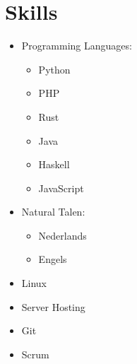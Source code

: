 \documentclass[a4paper,12pt]{article}
\begin{document}
\section{Skills}
\begin{itemize}
    \item Programming Languages:
        \begin{itemize}
            \item Python
            \item PHP
            \item Rust
            \item Java
            \item Haskell
            \item JavaScript
        \end{itemize}
    \item Natural Talen:
        \begin{itemize}
            \item Nederlands
            \item Engels
        \end{itemize}
    \item Linux
    \item Server Hosting
    \item Git
    \item Scrum
\end{itemize}

\vfill
{}
\end{document}
